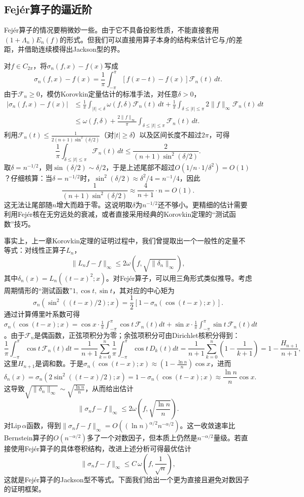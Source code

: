 \subsection{Fejér算子的逼近阶}

Fejér算子的情况要稍微妙一些。由于它不具备投影性质，不能直接套用$(1+\Lambda_n)E_n(f)$的形式。但我们可以直接用算子本身的结构来估计它与$f$的差距，并借助连续模得出Jackson型的界。

对$f\in C_{2\pi}$，将$\sigma_n(f,x)-f(x)$写成
\[
\sigma_n(f,x)-f(x)=\frac1\pi\int_{-\pi}^{\pi}[f(x-t)-f(x)]\mathcal{F}_n(t)\,dt.
\]
由于$\mathcal{F}_n\ge0$，模仿Korovkin定量估计的标准手法，对任意$\delta>0$，
\[
\begin{aligned}
|\sigma_n(f,x)-f(x)|
&\le\frac1\pi\int_{|t|<\delta}\omega(f,\delta)\mathcal{F}_n(t)\,dt
+\frac1\pi\int_{\delta\le|t|\le\pi}2\|f\|_\infty\mathcal{F}_n(t)\,dt\\
&\le\omega(f,\delta)+\frac{2\|f\|_\infty}{\pi}\int_{\delta\le|t|\le\pi}\mathcal{F}_n(t)\,dt.
\end{aligned}
\]
利用$\mathcal{F}_n(t)\le\frac{1}{2(n+1)\sin^2(\delta/2)}$（对$|t|\ge\delta$）以及区间长度不超过$2\pi$，可得
\[
\frac1\pi\int_{\delta\le|t|\le\pi}\mathcal{F}_n(t)\,dt
\le\frac{2}{(n+1)\sin^2(\delta/2)}.
\]
取$\delta=n^{-1/2}$，则$\sin(\delta/2)\sim\delta/2$，于是上述尾部不超过$O(1/n\cdot 1/\delta^2)=O(1)$？仔细核算：当$\delta=n^{-1/2}$时，$\sin^2(\delta/2)\approx \delta^2/4=n^{-1}/4$，因此
\[
\frac{1}{(n+1)\sin^2(\delta/2)}\approx\frac{4}{n+1}\cdot n=O(1).
\]
这无法让尾部随$n$增大而趋于零。这说明取$\delta$为$n^{-1/2}$还不够小。更精细的估计需要利用Fejér核在无穷远处的衰减，或者直接采用经典的Korovkin定理的“测试函数”技巧。

事实上，上一章Korovkin定理的证明过程中，我们曾提取出一个一般性的定量不等式：对线性正算子$L_n$，
\[
\|L_nf-f\|_\infty\le 2\omega\!\left(f,\sqrt{\|\delta_n\|_\infty}\right),
\]
其中$\delta_n(x)=L_n((t-x)^2;x)$。对Fejér算子，可以用三角形式类似推导。考虑周期情形的“测试函数”$1,\cos t,\sin t$，其对应的中心矩为
\[
\sigma_n(\sin^2((t-x)/2);x)=\frac12[1-\sigma_n(\cos(t-x);x)].
\]
通过计算傅里叶系数可得$\sigma_n(\cos(t-x);x)=\cos x\cdot\frac1\pi\int_{-\pi}^{\pi}\cos t\,\mathcal{F}_n(t)dt+\sin x\cdot\frac1\pi\int_{-\pi}^{\pi}\sin t\,\mathcal{F}_n(t)dt$。由于$\mathcal{F}_n$是偶函数，正弦项积分为零；余弦项积分可由Dirichlet核积分得到：
\[
\frac1\pi\int_{-\pi}^{\pi}\cos t\,\mathcal{F}_n(t)dt
=\frac1{n+1}\sum_{k=0}^{n}\frac1\pi\int_{-\pi}^{\pi}\cos t\,D_k(t)dt
=\frac1{n+1}\sum_{k=0}^{n}\left(1-\frac{1}{k+1}\right)=1-\frac{H_{n+1}}{n+1},
\]
这里$H_{n+1}$是调和数。于是$\sigma_n(\cos(t-x);x)\approx\left(1-\frac{\ln n}{n}\right)\cos x$，进而
\[
\delta_n(x)=\sigma_n(2\sin^2((t-x)/2);x)=1-\sigma_n(\cos(t-x);x)\approx\frac{\ln n}{n}\cos x.
\]
这导致$\sqrt{\|\delta_n\|_\infty}\sim\sqrt{\frac{\ln n}{n}}$，从而给出估计
\[
\|\sigma_nf-f\|_\infty\le 2\omega\!\left(f,\sqrt{\frac{\ln n}{n}}\right).
\]
对$\mathrm{Lip}\,\alpha$函数，得到$\|\sigma_nf-f\|_\infty=O((\ln n)^{\alpha/2}n^{-\alpha/2})$。这一收敛速率比Bernstein算子的$O(n^{-\alpha/2})$多了一个对数因子，但本质上仍然是$n^{-\alpha/2}$量级。若直接使用Fejér算子的具体卷积结构，改进上述分析可得最优估计
\[
\|\sigma_nf-f\|_\infty\le C\,\omega\!\left(f,\frac1{\sqrt{n}}\right),
\]
这就是Fejér算子的Jackson型不等式。下面我们给出一个更为直接且避免对数因子的证明框架。

